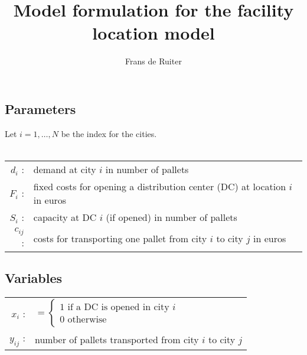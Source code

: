 \documentclass[11pt]{article}
\begin{document}
\title{Model formulation for the facility location model}
\date{}
\author{Frans de Ruiter}
\maketitle
\thispagestyle{empty}

\subsection*{Parameters}
Let $i=1,\dots,N$ be the index for the cities.\\ \\
\begin{tabular}{rl}
  $d_{i}$ : & demand at city $i$ in number of pallets\\
  $F_i$ : & fixed costs for opening a distribution center (DC) at location $i$ in euros\\
  $S_i$ : & capacity at DC $i$ (if opened) in number of pallets\\
  $c_{ij}$ : & costs for transporting one pallet from city $i$ to city $j$ in euros\\
\end{tabular}

\subsection*{Variables}
\begin{tabular}{rl}
  $x_i$ : & $=\begin{cases} 1 \text{ if a DC is opened in city } i\\ 0 \text{ otherwise} \end{cases}$\\
  $y_{ij}$ : & number of pallets transported from city $i$ to city $j$
\end{tabular}
\end{document}
